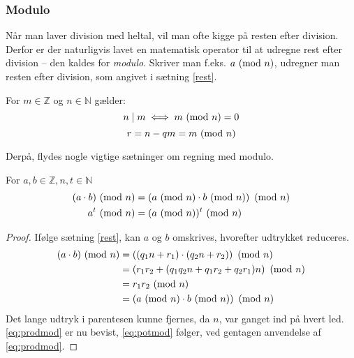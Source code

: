 \subsubsection{Modulo}
Når man laver division med heltal, vil man ofte kigge på resten efter division.
Derfor er der naturligvis lavet en matematisk operator til at udregne rest efter division -- den kaldes for \emph{modulo}.
Skriver man f.eks. \(a \ (\mathrm{mod}\ n)\), udregner man resten efter division, som angivet i sætning \ref{rest}.

\begin{definition}
    For \(m \in \mathbb{Z}\) og \(n \in \mathbb{N}\) gælder:
    \[n \mid m \iff m \ (\mathrm{mod}\ n) = 0\]
    \[r = n - q m = m \ (\mathrm{mod}\ n)\]%
\end{definition}

Derpå, flydes nogle vigtige sætninger om regning med modulo.
\begin{sent}
    \label{modmod}
    For \(a, b \in \mathbb{Z}, n, t \in \mathbb{N}\)
    \begin{align}
        (a \cdot b) \ (\mathrm{mod}\ n) &= \left(a \ (\mathrm{mod}\ n) \cdot b \ (\mathrm{mod}\ n)\right) \ (\mathrm{mod}\ n)\label{eq:prodmod}\\
        a^t \ (\mathrm{mod}\ n)         &= (a \ (\mathrm{mod}\ n))^t \ (\mathrm{mod}\ n)\label{eq:potmod}
    \end{align}
\end{sent}

\begin{proof}
    Ifølge sætning \ref{rest}, kan \(a\) og \(b\) omskrives, hvorefter udtrykket reduceres.
    \begin{align*}
(a \cdot b) \ (\mathrm{mod}\ n) &= \left((q_1 n + r_1) \cdot (q_2 n + r_2)\right) \ (\mathrm{mod}\ n)\\
                    &= \left( r_1 r_2 + (q_1 q_2 n + q_1 r_2 + q_2 r_1)n \right) \ (\mathrm{mod}\ n)\\
                    &= r_1 r_2 \ (\mathrm{mod}\ n)\\
                    &= \left(a \ (\mathrm{mod}\ n) \cdot b \ (\mathrm{mod}\ n)\right) \ (\mathrm{mod}\ n)
    \end{align*}
    Det lange udtryk i parentesen kunne fjernes, da \(n\), var ganget ind på hvert led.
    \eqref{eq:prodmod} er nu bevist, \eqref{eq:potmod} følger, ved gentagen anvendelse af \eqref{eq:prodmod}.
\end{proof}




